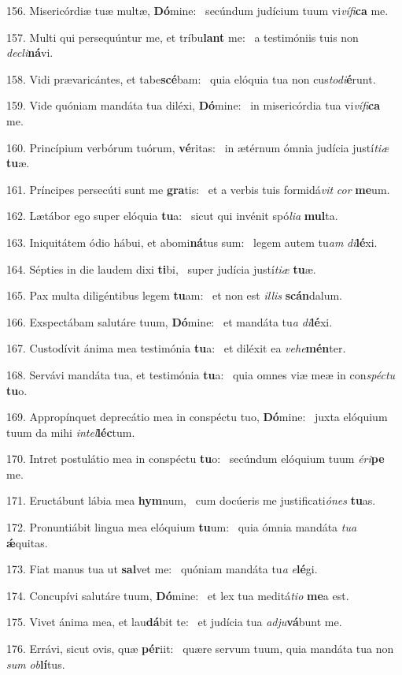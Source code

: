 156. Misericórdiæ tuæ multæ, \textbf{Dó}mine: \ast\  secúndum judícium tuum vi\textit{ví}\textit{fi}\textbf{ca} me.\

157. Multi qui persequúntur me, et tríbu\textbf{lant} me: \ast\  a testimóniis tuis non \textit{de}\textit{cli}\textbf{ná}vi.\

158. Vidi prævaricántes, et tabe\textbf{scé}bam: \ast\  quia elóquia tua non cus\textit{to}\textit{di}\textbf{é}runt.\

159. Vide quóniam mandáta tua diléxi, \textbf{Dó}mine: \ast\  in misericórdia tua vi\textit{ví}\textit{fi}\textbf{ca} me.\

160. Princípium verbórum tuórum, \textbf{vé}ritas: \ast\  in ætérnum ómnia judícia justí\textit{ti}\textit{æ} \textbf{tu}æ.\

161. Príncipes persecúti sunt me \textbf{gra}tis: \ast\  et a verbis tuis formidá\textit{vit} \textit{cor} \textbf{me}um.\

162. Lætábor ego super elóquia \textbf{tu}a: \ast\  sicut qui invénit spó\textit{li}\textit{a} \textbf{mul}ta.\

163. Iniquitátem ódio hábui, et abomi\textbf{ná}tus sum: \ast\  legem autem tu\textit{am} \textit{di}\textbf{lé}xi.\

164. Sépties in die laudem dixi \textbf{ti}bi, \ast\  super judícia justí\textit{ti}\textit{æ} \textbf{tu}æ.\

165. Pax multa diligéntibus legem \textbf{tu}am: \ast\  et non est \textit{il}\textit{lis} \textbf{scán}dalum.\

166. Exspectábam salutáre tuum, \textbf{Dó}mine: \ast\  et mandáta tu\textit{a} \textit{di}\textbf{lé}xi.\

167. Custodívit ánima mea testimónia \textbf{tu}a: \ast\  et diléxit ea \textit{ve}\textit{he}\textbf{mén}ter.\

168. Servávi mandáta tua, et testimónia \textbf{tu}a: \ast\  quia omnes viæ meæ in con\textit{spéc}\textit{tu} \textbf{tu}o.\

169. Appropínquet deprecátio mea in conspéctu tuo, \textbf{Dó}mine: \ast\  juxta elóquium tuum da mihi \textit{in}\textit{tel}\textbf{léc}tum.\

170. Intret postulátio mea in conspéctu \textbf{tu}o: \ast\  secúndum elóquium tuum \textit{é}\textit{ri}\textbf{pe} me.\

171. Eructábunt lábia mea \textbf{hym}num, \ast\  cum docúeris me justificati\textit{ó}\textit{nes} \textbf{tu}as.\

172. Pronuntiábit lingua mea elóquium \textbf{tu}um: \ast\  quia ómnia mandáta \textit{tu}\textit{a} \textbf{ǽ}quitas.\

173. Fiat manus tua ut \textbf{sal}vet me: \ast\  quóniam mandáta tu\textit{a} \textit{e}\textbf{lé}gi.\

174. Concupívi salutáre tuum, \textbf{Dó}mine: \ast\  et lex tua meditá\textit{ti}\textit{o} \textbf{me}a est.\

175. Vivet ánima mea, et lau\textbf{dá}bit te: \ast\  et judícia tua \textit{ad}\textit{ju}\textbf{vá}bunt me.\

176. Errávi, sicut ovis, quæ \textbf{pér}iit: \ast\  quære servum tuum, quia mandáta tua non \textit{sum} \textit{ob}\textbf{lí}tus.\

